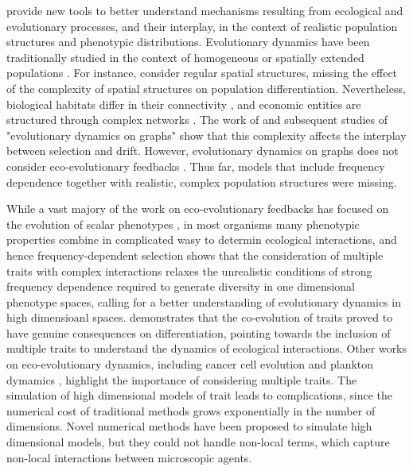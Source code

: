  provide new tools to better understand mechanisms resulting from ecological and evolutionary processes, and their interplay, in the context of realistic population structures and phenotypic distributions.
% 
Evolutionary dynamics have been traditionally studied in the context of homogeneous or spatially extended populations \citep{LiebermanHauert2005}.
% 
For instance, \citep{Slatkin1973,Slatkin1978,Kirkpatrick1997,Polechova2015,Polechova2018,AndradeRestrepo2019,Doebeli2003,Meszena1997,Yeaman2011,Debarre2013,Mirrahimi2020} consider regular spatial structures, missing the effect of the complexity of spatial structures on population differentiation.
% 
Nevertheless, biological habitats differ in their connectivity \xxx, and economic entities are structured through complex networks \xxx. The work of \citep{LiebermanHauert2005} and subsequent studies of "evolutionary dynamics on graphs" \xxx show that this complexity affects the interplay between selection and drift. However, evolutionary dynamics on graphs does not consider eco-evolutionary feedbacks \citep{Govaert2019a}.
% 
Thus far, models that include frequency dependence together with realistic, complex population structures were missing.

While a vast majory of the work on eco-evolutionary feedbacks has focused on the evolution of scalar phenotypes \citep{Doebeli2011}, in most organisms many phenotypic properties combine in complicated wasy to determin ecological interactions, and hence frequency-dependent selection \citep{Doebeli2014}
% 
\citep{Doebeli2011} shows that the consideration of multiple traits with complex interactions relaxes the unrealistic conditions of strong frequency dependence required to generate diversity in one dimensional phenotype spaces, calling for a better understanding of evolutionary dynamics in high dimensioanl spaces.
% 
 demonstrates that the co-evolution of traits proved to have genuine consequences on differentiation, pointing towards the inclusion of multiple traits to understand the dynamics of ecological interactions.
% 
Other works on eco-evolutionary dynamics, including cancer cell evolution \xxx and plankton dymamics \xxx, highlight the importance of considering multiple traits.
% 
The simulation of high dimensional models of trait leads to complications, since the numerical cost of traditional methods grows exponentially in the number of dimensions. 
% 
Novel numerical methods have been proposed to simulate high dimensional models, but they could not handle non-local terms, which capture non-local interactions between microscopic agents.

